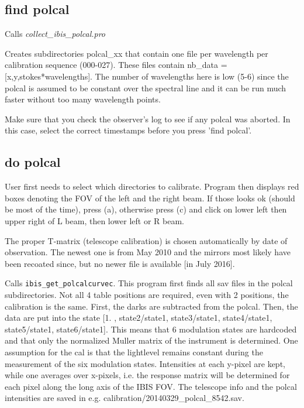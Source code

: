 \documentclass[a4paper,12pt]{article}
\begin{document}
\subsection{find polcal}
Calls \textit{collect\_ibis\_polcal.pro}

Creates subdirectories polcal\_xx that contain one file per wavelength per calibration sequence (000-027). These files contain nb\_data = [x,y,stokes*wavelengths]. The number of wavelengths here is low (5-6) since the polcal is assumed to be constant over the spectral line and it can be run much faster without too many wavelength points.

Make sure that you check the observer's log to see if any polcal was
aborted. In this case, select the correct timestamps
before you press 'find polcal'.

\subsection{do polcal}

User first needs to select which directories to calibrate. Program then displays red boxes denoting the FOV of the left and the right beam. If those looks ok (should be most of the time), press (a), otherwise press (c) and click on lower left then upper right of L beam, then lower left or R beam.

The proper T-matrix (telescope calibration) is chosen automatically by date of observation.  The newest one is from May 2010 and the mirrors most likely have been recoated since, but no newer file is available [in July 2016].

 Calls \texttt{ibis\_get\_polcalcurvec}. This program first finds all sav files in the polcal subdirectories. Not all 4 table positions are required, even with 2 positions, the calibration is the same. First, the darks are subtracted from the polcal. Then, the data are put into the state [1. , state2/state1, state3/state1, state4/state1, state5/state1, state6/state1]. This means that 6 modulation states are hardcoded and that only the normalized Muller matrix of the instrument is determined. One assumption for the cal is that the lightlevel remains constant during the measurement of the six modulation states. Intensities at each y-pixel are kept, while one averages over x-pixels, i.e. the response matrix will be determined for each pixel along the long axis of the IBIS FOV. The telescope info and the polcal intensities are saved in  e.g. calibration/20140329\_polcal\_8542.sav.
 
\end{document}

